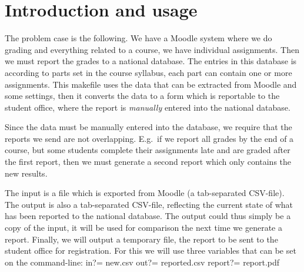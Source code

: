 \section{Introduction and usage}%
\label{Intro}

The problem case is the following.
We have a Moodle system where we do grading and everything related to a course, 
\ie we have individual assignments.
Then we must report the grades to a national database.
The entries in this database is according to parts set in the course syllabus, 
each part can contain one or more assignments.
This makefile uses the data that can be extracted from Moodle and some 
settings, then it converts the data to a form which is reportable to the 
student office, where the report is \emph{manually} entered into the national 
database.

Since the data must be manually entered into the database, we require that the 
reports we send are not overlapping.
E.g.\ if we report all grades by the end of a course, but some students 
complete their assignments late and are graded after the first report, then we 
must generate a second report which only contains the new results.

The input is a file which is exported from Moodle (a tab-separated CSV-file).
The output is also a tab-separated CSV-file, reflecting the current state of 
what has been reported to the national database.
The output could thus simply be a copy of the input, it will be used for 
comparison the next time we generate a report.
Finally, we will output a temporary file, the report to be sent to the student 
office for registration.
For this we will use three variables that can be set on the command-line:
\endmoddef\nwstartdeflinemarkup{}\nwenddeflinemarkup
in?=      new.csv
out?=     reported.csv
report?=  report.pdf
\nwendcode{}\nwdocspar

